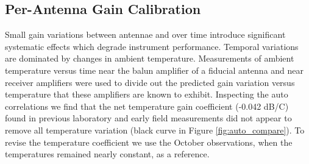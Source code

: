 \documentclass[preprint]{aastex}
\begin{document}
\subsection{Per-Antenna Gain Calibration}


Small gain variations between antennae and over time introduce significant systematic effects which degrade 
instrument performance. Temporal variations are dominated by changes in ambient temperature. 
Measurements of ambient temperature versus time near the balun amplifier of a fiducial antenna and near
receiver amplifiers were used to divide out the predicted gain variation versus temperature that these amplifiers
are known to exhibit.  Inspecting the auto correlations we find that the net temperature gain coefficient (-0.042 dB/C) found in previous laboratory \cite{Parashare:2011p9872} and early field 
measurements  \cite{Pober:2012p8800} did not appear to remove all temperature variation (black curve in Figure \ref{fig:auto_compare}).  To
revise the temperature coefficient we use the October observations, when the temperatures remained nearly constant, as a reference.
\end{document}
